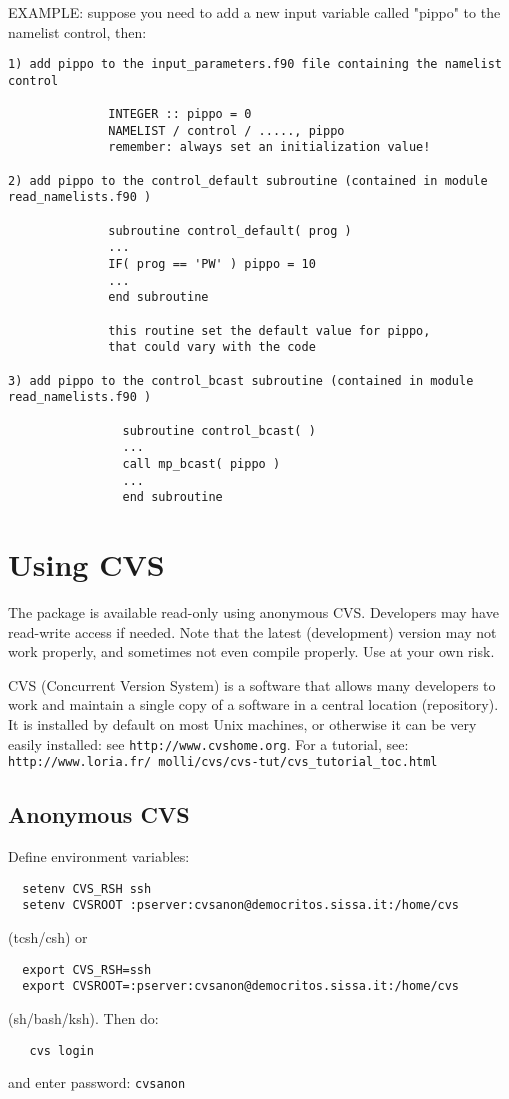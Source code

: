 \documentclass[12pt,a4paper]{article}
\begin{document}
EXAMPLE:
suppose you need to add a new input variable called "pippo"
to the namelist control, then:

\begin{verbatim}
1) add pippo to the input_parameters.f90 file containing the namelist
control

              INTEGER :: pippo = 0
              NAMELIST / control / ....., pippo
              remember: always set an initialization value!

2) add pippo to the control_default subroutine (contained in module
read_namelists.f90 )

              subroutine control_default( prog )
              ...
              IF( prog == 'PW' ) pippo = 10
              ...
              end subroutine

              this routine set the default value for pippo,
              that could vary with the code

3) add pippo to the control_bcast subroutine (contained in module 
read_namelists.f90 )

                subroutine control_bcast( )
                ...
                call mp_bcast( pippo )
                ...
                end subroutine
\end{verbatim}

\section{Using CVS}

\label{cvs}
The package is available read-only using anonymous CVS. Developers 
may have read-write access if needed. Note that the latest
(development) version may not work properly, and sometimes not 
even compile properly. Use at your own risk.

CVS (Concurrent Version System) is a software that allows many
developers to work and maintain a single copy of a software in
a central location (repository). It is installed by default on
most Unix machines, or otherwise it can be very easily installed:
see {\tt http://www.cvshome.org}. For a tutorial, see:\\
{\tt http://www.loria.fr/~{}molli/cvs/cvs-tut/cvs\_tutorial\_toc.html}

\subsection{Anonymous CVS}

Define environment variables:
\begin{verbatim}
  setenv CVS_RSH ssh
  setenv CVSROOT :pserver:cvsanon@democritos.sissa.it:/home/cvs
\end{verbatim}
(tcsh/csh) or
\begin{verbatim}
  export CVS_RSH=ssh
  export CVSROOT=:pserver:cvsanon@democritos.sissa.it:/home/cvs
\end{verbatim}
(sh/bash/ksh). Then do:
\begin{verbatim}
   cvs login
\end{verbatim}
and enter password: \texttt{cvsanon}
\end{document}
